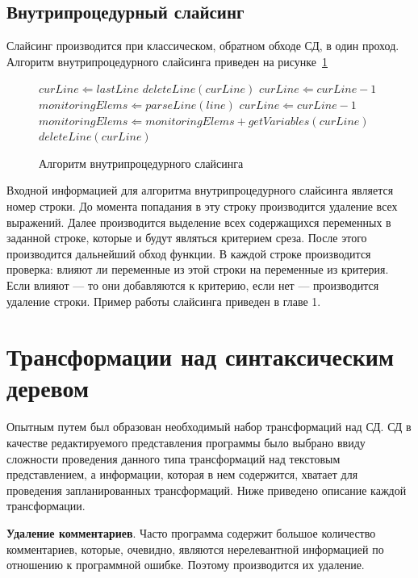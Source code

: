 \subsection{Внутрипроцедурный слайсинг}
Слайсинг производится при классическом, обратном обходе СД, в один проход. Алгоритм внутрипроцедурного слайсинга приведен на рисунке~\ref{alg:interproceduralslicing}
\begin{figure}
\begin{algorithmic}[1]
\STATE $curLine \Leftarrow lastLine$
	\STATE $deleteLine(curLine)$
	\STATE $curLine \Leftarrow curLine - 1$
\ENDWHILE
\STATE $monitoringElems \Leftarrow parseLine(line)$
\STATE $curLine \Leftarrow curLine - 1$
		\STATE $monitoringElems \Leftarrow monitoringElems + getVariables(curLine)$ 
	\ELSE 
		\STATE $deleteLine(curLine)$ 
	\ENDIF
\ENDWHILE
\end{algorithmic}
\caption{\label{alg:interproceduralslicing}Алгоритм внутрипроцедурного слайсинга}
\end{figure}


Входной информацией для алгоритма внутрипроцедурного слайсинга является номер строки. До момента попадания в эту строку производится удаление всех выражений. Далее производится выделение всех содержащихся переменных в заданной строке, которые и будут являться критерием среза. После этого производится дальнейший обход функции. В каждой строке производится проверка: влияют ли переменные из этой строки на переменные из критерия. Если влияют --- то они добавляются к критерию, если нет --- производится удаление строки. Пример работы слайсинга приведен в главе 1.

\section{Трансформации над синтаксическим деревом}
Опытным путем был образован необходимый набор трансформаций над СД. СД в качестве редактируемого представления программы было выбрано ввиду сложности проведения данного типа трансформаций над текстовым представлением, а информации, которая в нем содержится, хватает для проведения запланированных трансформаций. Ниже приведено описание каждой трансформации. 

\textbf{Удаление комментариев}. Часто программа содержит большое количество комментариев, которые, очевидно, являются нерелевантной информацией по отношению к программной ошибке. Поэтому производится их удаление.

